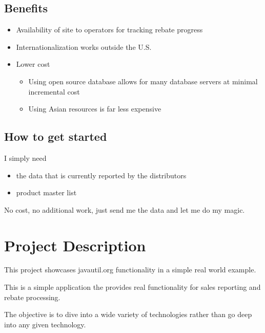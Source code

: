 \documentclass[letterpaper,10pt,english]{sphinxmanual}
\begin{document}
\subsection{Benefits}
\label{\detokenize{ProductOffering:benefits}}\begin{itemize}
\item {} 
Availability of site to operators for tracking rebate progress

\item {} 
Internationalization works outside the U.S.

\item {} 
Lower cost
\begin{itemize}
\item {} 
Using open source database allows for many database servers at minimal incremental cost

\item {} 
Using Asian resources is far less expensive

\end{itemize}

\end{itemize}


\subsection{How to get started}
\label{\detokenize{ProductOffering:how-to-get-started}}
I simply need
\begin{itemize}
\item {} 
the data that is currently reported by the distributors

\item {} 
product master list

\end{itemize}

No cost, no additional work, just send me the data and let me do my magic.


\section{Project Description}
\label{\detokenize{ProjectDescription:project-description}}\label{\detokenize{ProjectDescription::doc}}
This project showcases javautil.org functionality in a simple real world example.

This is a simple application the provides real functionality for sales reporting and rebate
processing.

The objective is to dive into a wide variety of technologies rather than go deep into any
given technology.
\end{document}
